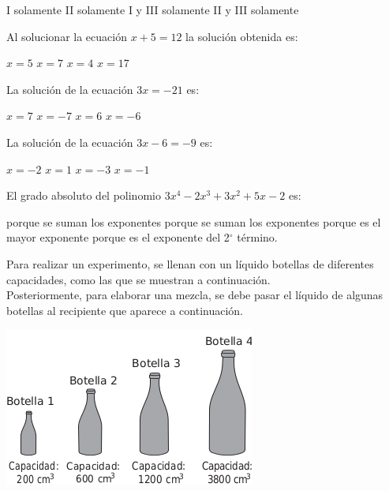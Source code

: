 \documentclass[10pt,letterpaper,addpoints]{exam}
\begin{document}
\begin{questions}
\begin{oneparchoices}
\choice I solamente
\choice II solamente
\choice I y III solamente
\CorrectChoice II y III solamente
\end{oneparchoices}
\question Al solucionar la ecuación $x+5=12$ la solución obtenida es:

\begin{oneparchoices}
\choice $x=5$
\CorrectChoice $x=7$
\choice $x=4$
\choice $x=17$
\end{oneparchoices}
\question La solución de la ecuación $3x=-21$ es:

\begin{oneparchoices}
\choice $x=7$
\CorrectChoice $x=-7$
\choice $x=6$
\choice $x=-6$
\end{oneparchoices}
\question La solución de la ecuación $3x-6=-9$ es:

\begin{oneparchoices}
\choice $x=-2$
\choice $x=1$
\choice $x=-3$
\CorrectChoice $x=-1$
\end{oneparchoices}
\question El grado absoluto del polinomio $3x^{4}-2x^{3}+3x^{2}+5x-2$ es:

\begin{choices}
 porque se suman los exponentes
 porque se suman los exponentes
 porque es el mayor exponente
 porque es el exponente del 2$^{\circ}$ término.
\end{choices}
\begin{minipage}{.5\textwidth}
\question Para realizar un experimento, se llenan con un líquido botellas de diferentes capacidades, como las que se muestran a continuación.\\

Posteriormente, para elaborar una mezcla, se debe pasar el líquido de algunas botellas al recipiente que aparece a continuación.
\end{minipage}
\begin{minipage}{.5\textwidth}
\begin{center}
\includegraphics[scale=.7]{Images/botellas.png} 
\end{center}
\end{minipage}


\end{questions}
\end{document}
